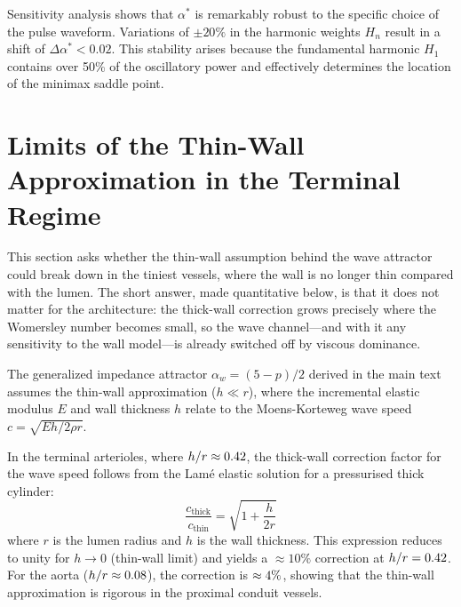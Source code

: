 \documentclass[11pt,a4paper]{article}
\theoremstyle{remark}
\begin{document}
Sensitivity analysis shows that $\alpha^*$ is remarkably robust to the specific
choice of the pulse waveform. Variations of $\pm 20\%$ in the harmonic weights
$H_n$ result in a shift of $\Delta \alpha^* < 0.02$. This stability arises
because the fundamental harmonic $H_1$ contains over 50\% of the oscillatory
power and effectively determines the location of the minimax saddle point.


\section{Limits of the Thin-Wall Approximation in the Terminal Regime}
\label{sec:S5}

This section asks whether the thin-wall assumption behind the wave
attractor could break down in the tiniest vessels, where the wall is no longer
thin compared with the lumen. The short answer, made quantitative below, is that
it does not matter for the architecture: the thick-wall correction grows
precisely where the Womersley number becomes small, so the wave channel---and
with it any sensitivity to the wall model---is already switched off by viscous
dominance.

The generalized impedance attractor $\alpha_w = (5-p)/2$ derived in the
main text assumes the thin-wall approximation ($h \ll r$), where the incremental
elastic modulus $E$ and wall thickness $h$ relate to the Moens-Korteweg wave
speed $c = \sqrt{Eh/2\rho r}$.

In the terminal arterioles, where $h/r \approx 0.42$,
the thick-wall correction factor for the wave speed follows from the Lam\'{e}
elastic solution for a pressurised thick cylinder:
\begin{equation}
    \frac{c_{\mathrm{thick}}}{c_{\mathrm{thin}}}
    = \sqrt{1 + \frac{h}{2r}}
\end{equation}
where $r$ is the lumen radius and $h$ is the wall thickness. This expression
reduces to unity for $h \to 0$ (thin-wall limit) and yields a $\approx 10\%$
correction at $h/r = 0.42$. For the aorta ($h/r \approx
0.08$), the correction is $\approx
4\%$, showing that the thin-wall approximation is
rigorous in the proximal conduit vessels.
\end{document}
